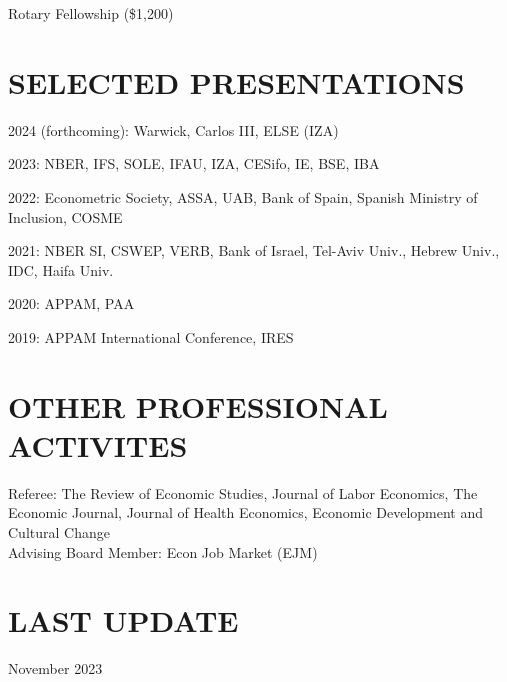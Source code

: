 \documentclass[margin]{res} %
\begin{document}
\begin{resume}
		 Rotary Fellowship (\$1,200) 


 
\section{SELECTED PRESENTATIONS} 
\vspace{2em}

 2024 (forthcoming): Warwick, Carlos III, ELSE (IZA)

 2023: NBER, IFS, SOLE, IFAU, IZA, CESifo, IE, BSE, IBA

 2022: Econometric Society, ASSA, UAB, Bank of Spain, Spanish Ministry of Inclusion, COSME

 2021: NBER SI, CSWEP, VERB, Bank of Israel, Tel-Aviv Univ., Hebrew Univ., IDC, Haifa Univ.

 2020: APPAM, PAA

 2019: APPAM International Conference, IRES

\section{OTHER PROFESSIONAL ACTIVITES} 

Referee: The Review of Economic Studies, Journal of Labor Economics, The Economic Journal, Journal of Health Economics, Economic Development and Cultural Change
\\
Advising Board Member: Econ Job Market (EJM)

\section{LAST UPDATE} 
November 2023

\end{resume}
\end{document}
